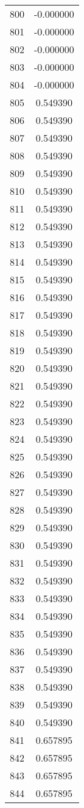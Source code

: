 \documentclass[12pt]{article}
\begin{document}
\begin{longtable}{@{}cc@{}}
800 & -0.000000 \\
801 & -0.000000 \\
802 & -0.000000 \\
803 & -0.000000 \\
804 & -0.000000 \\
805 & 0.549390 \\
806 & 0.549390 \\
807 & 0.549390 \\
808 & 0.549390 \\
809 & 0.549390 \\
810 & 0.549390 \\
811 & 0.549390 \\
812 & 0.549390 \\
813 & 0.549390 \\
814 & 0.549390 \\
815 & 0.549390 \\
816 & 0.549390 \\
817 & 0.549390 \\
818 & 0.549390 \\
819 & 0.549390 \\
820 & 0.549390 \\
821 & 0.549390 \\
822 & 0.549390 \\
823 & 0.549390 \\
824 & 0.549390 \\
825 & 0.549390 \\
826 & 0.549390 \\
827 & 0.549390 \\
828 & 0.549390 \\
829 & 0.549390 \\
830 & 0.549390 \\
831 & 0.549390 \\
832 & 0.549390 \\
833 & 0.549390 \\
834 & 0.549390 \\
835 & 0.549390 \\
836 & 0.549390 \\
837 & 0.549390 \\
838 & 0.549390 \\
839 & 0.549390 \\
840 & 0.549390 \\
841 & 0.657895 \\
842 & 0.657895 \\
843 & 0.657895 \\
844 & 0.657895 \\

\end{longtable}
\end{document}

